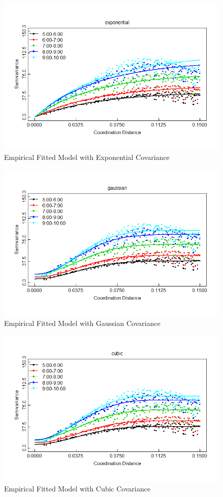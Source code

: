 \documentclass[hidelinks,12pt]{article}
\begin{document}
\FloatBarrier
	\begin{figure}[!ht]
		\includegraphics[width=\textwidth]{semfit_exponential.png}
		\caption{Empirical Fitted Model with Exponential Covariance \label{fig:semexp}}
	\end{figure}
\FloatBarrier
	\begin{figure}[!ht]
		\includegraphics[width=\textwidth]{semfit_gaussian.png}
		\caption{Empirical Fitted Model with Gaussian Covariance \label{fig:semgau}}
	\end{figure}
\FloatBarrier
	\begin{figure}[!ht]
		\includegraphics[width=\textwidth]{semfit_cubic.png}
		\caption{Empirical Fitted Model with Cubic Covariance \label{fig:semcub}}
	\end{figure}
\end{document}
